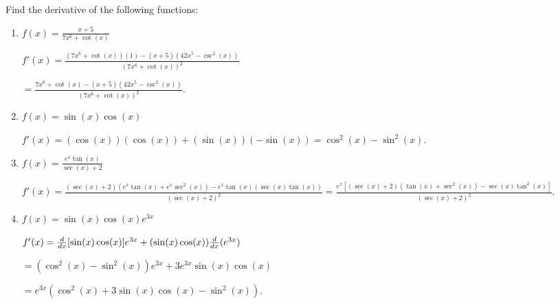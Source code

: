 \documentclass[handout,nooutcomes]{ximera}
\begin{document}
\begin{problem}
Find the derivative of the following functions:

	\begin{enumerate}
	
	\item  $f(x) = \frac{x+5}{7x^6 + \cot(x)}$
			\begin{freeResponse}
			$f'(x) = \frac{(7x^6 + \cot(x))(1) - (x+5)(42x^5 - \csc^2(x))}{(7x^6 + \cot(x))^2}$
			
			$= \frac{7x^6 + \cot(x) - (x+5)(42x^5 - \csc^2(x))}{(7x^6 + \cot(x))^2}$.
			\end{freeResponse}
			
			
			
	\item  $f(x) = \sin(x) \cos(x)$
			\begin{freeResponse}
			$f'(x) = (\cos(x))(\cos(x)) + (\sin(x))(-\sin(x)) = \cos^2(x) - \sin^2(x)$.
			\end{freeResponse}
			
			
			
	\item  $f(x) = \frac{e^x \tan(x)}{\sec(x) + 2}$
			\begin{freeResponse}
			$f'(x) = \frac{(\sec(x)+2)(e^x \tan(x) + e^x \sec^2(x)) - e^x \tan(x) (\sec(x) \tan(x))}{(\sec(x) + 2)^2}
			= \frac{e^x[(\sec(x) + 2)(\tan(x) + \sec^2(x)) - \sec(x) \tan^2(x)]}{(\sec(x) + 2)^2}$.
			\end{freeResponse}
			
			
			
	\item  $f(x) = \sin(x) \cos(x) e^{3x}$
			\begin{freeResponse}
			$f'(x) = \frac{d}{dx}[\sin(x) \cos(x)] e^{3x} + (\sin(x) \cos(x)) \frac{d}{dx}(e^{3x})$
			
			$= (\cos^2(x) - \sin^2(x))e^{3x} + 3e^{3x} \sin(x) \cos(x)$
			
			$= e^{3x}(\cos^2(x) + 3\sin(x) \cos(x) - \sin^2(x))$.
			\end{freeResponse}
			
			
			
	\end{enumerate}
		
\end{problem}
\end{document}
